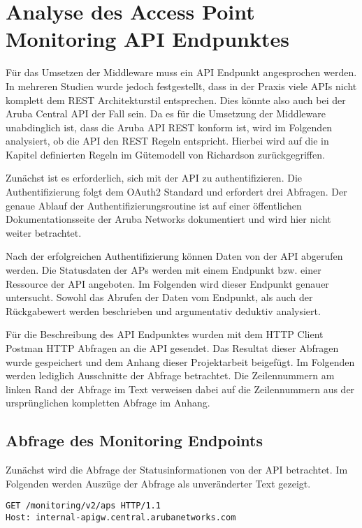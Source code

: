 \section{Analyse des Access Point Monitoring API Endpunktes}\label{section:analyse-des-access-point-monitoring-endpunkte}

Für das Umsetzen der Middleware muss ein API Endpunkt angesprochen werden. In mehreren Studien wurde jedoch festgestellt, dass in der Praxis viele APIs nicht komplett dem REST Architekturstil entsprechen. Dies könnte also auch bei der Aruba Central API der Fall sein. Da es für die Umsetzung der Middleware unabdinglich ist, dass die Aruba API REST konform ist, wird im Folgenden analysiert, ob die API den REST Regeln entspricht. Hierbei wird auf die in Kapitel definierten Regeln im Gütemodell von Richardson zurückgegriffen.

Zunächst ist es erforderlich, sich mit der API zu authentifizieren. Die Authentifizierung folgt dem OAuth2 Standard und erfordert drei Abfragen. Der genaue Ablauf der Authentifizierungsroutine ist auf einer öffentlichen Dokumentationsseite der Aruba Networks dokumentiert und wird hier nicht weiter betrachtet.

Nach der erfolgreichen Authentifizierung können Daten von der API abgerufen werden. Die Statusdaten der APs werden mit einem Endpunkt bzw. einer Ressource der API angeboten. Im Folgenden wird dieser Endpunkt genauer untersucht. Sowohl das Abrufen der Daten vom Endpunkt, als auch der Rückgabewert werden beschrieben und argumentativ deduktiv analysiert. 

Für die Beschreibung des API Endpunktes wurden mit dem HTTP Client Postman HTTP Abfragen an die API gesendet. Das Resultat dieser Abfragen wurde gespeichert und dem Anhang dieser Projektarbeit beigefügt. Im Folgenden werden lediglich Ausschnitte der Abfrage betrachtet. Die Zeilennummern am linken Rand der Abfrage im Text verweisen dabei auf die Zeilennummern aus der ursprünglichen kompletten Abfrage im Anhang.

\subsection{Abfrage des Monitoring Endpoints}\label{subsection:abfrage-des-monitoring-endpunktes}

Zunächst wird die Abfrage der Statusinformationen von der API betrachtet. Im Folgenden werden Auszüge der Abfrage als unveränderter Text gezeigt.

\begin{lstlisting}
GET /monitoring/v2/aps HTTP/1.1
Host: internal-apigw.central.arubanetworks.com  
\end{lstlisting}

